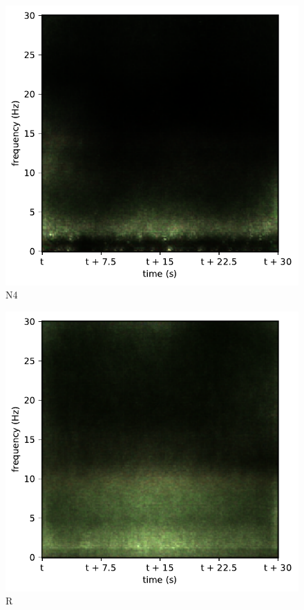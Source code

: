 \begin{subfigure}{.16\textwidth}
  \centering
  \includegraphics[width=1\linewidth]{./../Article/pics/class_master_4}
  \caption{N4}
  \label{fig_1_25}
\end{subfigure}%
\begin{subfigure}{.16\textwidth}
  \centering
  \includegraphics[width=1\linewidth]{./../Article/pics/class_master_5}
  \caption{R}
  \label{fig_1_26}
\end{subfigure}


